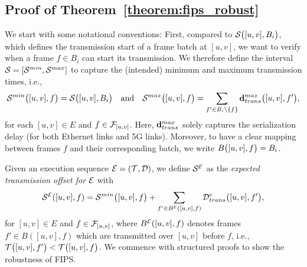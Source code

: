 \subsection{Proof of Theorem~\ref{theorem:fips_robust}} \label{appendix:theorem_proof}
We start with some notational conventions:
First, compared to $\S{[u,v], B_i}$, which defines the transmission start of a frame batch at $[u,v]$, we want to verify when a frame $f \in B_i$ can start its transmission.
We therefore define the interval $\S{} = [\Smin{}, \Smax{}]$ to capture the (intended) minimum and maximum transmission times, i.e.,
\begin{align} \label{eq:sminmax}
  \Smin{[u,v], f} = \S{[u,v], B_i} \quad \text{and} \quad \Smax{[u,v], f} = \sum_{f' \in B_i \setminus \{f\}} \dpdbtransmax{[u,v], f'},
\end{align}
for each $[u,v] \in E$ and $f \in \mathcal{F}_{[u,v]}$.
Here, $\dpdbtransmax{}$ solely captures the serialization delay (for both Ethernet links and 5G links).
Moreover, to have a clear mapping between frames $f$ and their corresponding batch, we write $\I{[u,v], f} = B_i$.

Given an execution sequence $\E = (\T{}, \D{})$, we define $\S{}^\E$ as the \textit{expected transmission offset for $\mathcal{E}$} with
\begin{equation} \label{eq:fips:se}
  \S{}^\E([u,v],f) = \Smin{[u,v],f} + \sum_{f' \in B^\E([u,v], f)} \eDtrans{[u,v],f'},
\end{equation}
for $[u,v] \in E$ and $f \in \mathcal{F}_{[u,v]}$, where $B^{\mathcal{E}}([u,v], f)$ denotes frames $f' \in B([u,v], f)$ which are transmitted over $[u,v]$ before $f$, i.e., $\T{[u,v],f'} < \T{[u,v],f}$.
We commence with structured proofs to show the robustness of FIPS.

